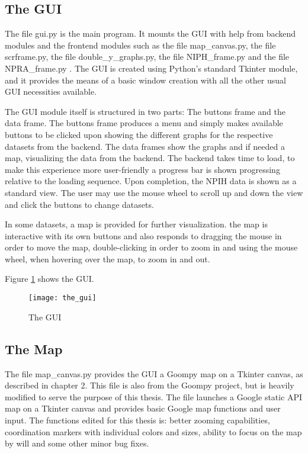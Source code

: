 \subsection{The GUI}
The file gui.py is the main program. It mounts the GUI with help from backend modules and the frontend modules such as the file map\_canvas.py, the file scrframe.py, the file double\_y\_graphs.py, the file NIPH\_frame.py and the file NPRA\_frame.py . The GUI is created using Python's standard Tkinter module, and it provides the means of a basic window creation with all the other usual GUI necessities available. 

The GUI module itself is structured in two parts: The buttons frame and the data frame. The buttons frame produces a menu and simply makes available buttons to be clicked upon showing the different graphs for the respective datasets from the backend. The data frames show the graphs and if needed a map, visualizing the data from the backend. The backend takes time to load, to make this experience more user-friendly a progress bar is shown progressing relative to the loading sequence. Upon completion, the NPIH data is shown as a standard view. The user may use the mouse wheel to scroll up and down the view and click the buttons to change datasets. 

In some datasets, a map is provided for further visualization. the map is interactive with its own buttons and also responds to dragging the mouse in order to move the map, double-clicking in order to zoom in and using the mouse wheel, when hovering over the map, to zoom in and out.

Figure \ref{fig:the_gui} shows the GUI.

\begin{figure}[ht]
\texttt{[image: the\_gui]}
\centering
\caption{The GUI}
\label{fig:the_gui}
\end{figure}



\subsection{The Map}
The file map\_canvas.py provides the GUI a Goompy\cite{goompy} map on a Tkinter canvas, as described in chapter 2. This file is also from the Goompy project, but is heavily modified to serve the purpose of this thesis. The file launches a Google static API map on a Tkinter canvas and provides basic Google map functions and user input. The functions edited for this thesis is: better zooming capabilities, coordination markers with individual colors and sizes, ability to focus on the map by will and some other minor bug fixes.






